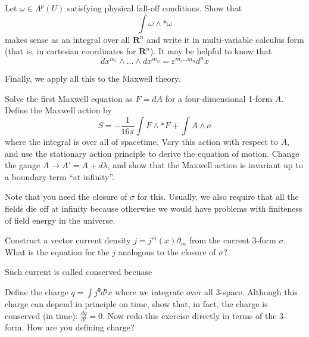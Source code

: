\begin{exercise}
Let $ω∈ Λ^p(U)$ satisfying physical fall-off conditions. Show that 
$$
 ∫ ω  \wedge \ast ω 
$$
makes sense as an integral over all $𝐑^n$ and write it in multi-variable calculus form (that is, in cartesian  coordinates for $𝐑^n$). It may be helpful to know that 
$$
dx^{m₁}  \wedge \dots  \wedge dx^{m_n} = ε^{m₁ ... m_n} d^nx 
$$ 
\end{exercise}

Finally, we apply all this to the Maxwell theory.
\begin{exercise}
Solve the first Maxwell equation as $F=dA$ for a four-dimensional 1-form $A$. Define the Maxwell action by 
$$
S = -\frac1{16π} ∫ F \wedge \ast F +  ∫ A \wedge σ
$$
where the integral is over all of spacetime. 
Vary this action with respect to $A$, and use the stationary action principle to derive the equation of motion. 
Change the gauge $A→ A' = A+d λ $, and show that the Maxwell action is invariant up to a boundary term “at infinity”. 
\end{exercise}
Note that you need the closure of $σ$ for this. Usually, we also require that all the fields die off at infinity because otherwise we would have problems with finiteness of field energy in the universe. 
\begin{exercise}
Construct a vector current density $j =j^m(x) ∂_m$ from the current 3-form $σ$. What is the equation for the $j$ analogous to the closure of $σ$? 
\end{exercise}
Such current is called conserved becuase 
\begin{exercise}
Define the charge $q = ∫ j⁰ d³x$ where we integrate over all 3-space. Although this charge can depend in principle on time, show that, in fact, the charge is conserved (in time): $\frac {dq}{dt} = 0$. 
Now redo this exercise directly in terms of the 3-form. 
How are you defining charge?
\end{exercise}








